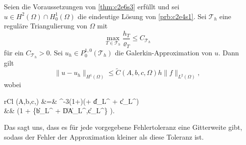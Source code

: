 \documentclass[../skript.tex]{subfiles}
\begin{document}
	
\begin{corollary}\label{cor:c2e6s3}
	Seien die Voraussetzungen von \cref{thm:c2e6s3} erfüllt und sei $u\in H^2(\Omega)\cap H^1_0(\Omega)$ die eindeutige Lösung von \cref{prb:c2e4s1}. Sei $\mathcal{T}_h$ eine reguläre Triangulierung von $\Omega$ mit 
	\[
		\max_{T\in\mathcal{T}_h} \frac{h_T}{\varrho_T} \leq C_{\mathcal{T}_h} 
	\]
	für ein $C_{\mathcal{T}_h} > 0$. Sei $u_h\in P^{1,0}_0(\mathcal{T}_h)$ die Galerkin-Approximation von $u$. Dann gilt
	\[
		\| u-u_h\|_{H^1(\Omega)}\leq \tilde{C}(A,b,c,\Omega)h\|f\|_{L^2(\Omega)},
	\]
	wobei 
	\begin{IEEEeqnarray*}{rCl}
		(A,b,c,\Omega) &=& \lambda^{-3}\left(1+\right)(\Lambda + \|d\|_{L^\infty} + \|c\|_{L^\infty}) \\ 
		&& \; {} \cdot \left(1 + \max\{\|b\|_{L^\infty} + \|DA\|_{L^\infty},\|c\|_{L^\infty}\} \right).
	\end{IEEEeqnarray*}
\end{corollary}
\begin{remarknonumb}
	Das sagt uns, dass es für jede vorgegebene Fehlertoleranz eine Gitterweite gibt, sodass der Fehler der Approximation kleiner als diese Toleranz ist.
\end{remarknonumb}
\end{document}
